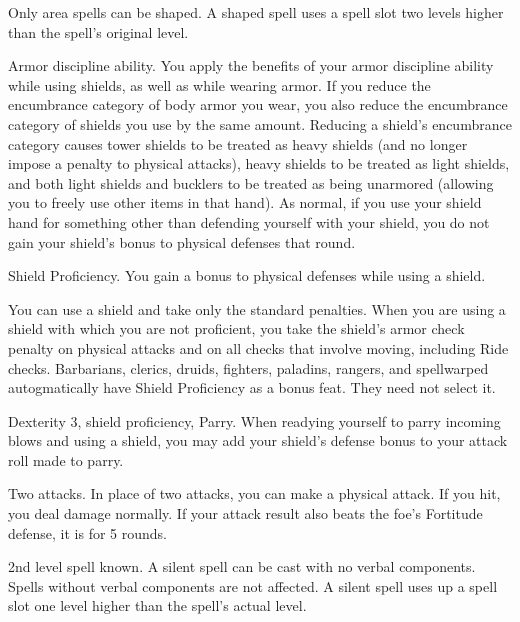 Only area spells can be shaped.
A shaped spell uses a spell slot two levels higher than the spell's original level.

\featpre Armor discipline ability.
\featben You apply the benefits of your armor discipline ability while using shields, as well as while wearing armor.
If you reduce the encumbrance category of body armor you wear, you also reduce the encumbrance category of shields you use by the same amount.
Reducing a shield's encumbrance category causes tower shields to be treated as heavy shields (and no longer impose a  penalty to physical attacks), heavy shields to be treated as light shields, and both light shields and bucklers to be treated as being unarmored (allowing you to freely use other items in that hand).
As normal, if you use your shield hand for something other than defending yourself with your shield, you do not gain your shield's bonus to physical defenses that round.

\featpre Shield Proficiency.
\featben You gain a  bonus to physical defenses while using a shield.

\featben You can use a shield and take only the standard penalties.
When you are using a shield with which you are not proficient, you take the shield's armor check penalty on physical attacks and on all checks that involve moving, including Ride checks.
Barbarians, clerics, druids, fighters, paladins, rangers, and spellwarped autogmatically have Shield Proficiency as a bonus feat.
They need not select it.

\featpres Dexterity 3, shield proficiency, Parry.
\featben When readying yourself to parry incoming blows and using a shield, you may add your shield's defense bonus to your attack roll made to parry.

\featpre Two attacks.
\featben In place of two attacks, you can make a physical attack.
If you hit, you deal damage normally.
If your attack result also beats the foe's Fortitude defense, it is \staggered for 5 rounds.

\featpre 2nd level spell known.
\featben A silent spell can be cast with no verbal components.
Spells without verbal components are not affected.
A silent spell uses up a spell slot one level higher than the spell's actual level.

